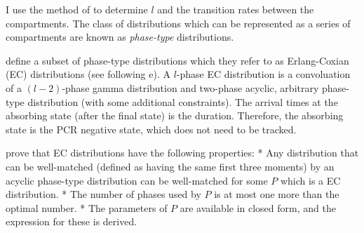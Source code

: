 \documentclass[thesis.tex]{subfiles}
\begin{document}
I use the method of \textcite{osogamiClosed} to determine $l$ and the transition rates between the compartments.
The class of distributions which can be represented as a series of compartments are known as \emph{phase-type} distributions.

\Textcite{osogamiClosed} define a subset of phase-type distributions which they refer to as Erlang-Coxian (EC) distributions (see following e).
A $l$-phase EC distribution is a convoluation of a $(l-2)$-phase gamma distribution and two-phase acyclic, arbitrary phase-type distribution (with some additional constraints).
The arrival times at the absorbing state (after the final state) is the duration.
Therefore, the absorbing state is the PCR negative state, which does not need to be tracked.

\Textcite{osogamiClosed} prove that EC distributions have the following properties:
* Any distribution that can be well-matched (defined as having the same first three moments) by an acyclic
phase-type distribution can be well-matched for some $P$
which is a EC distribution.
* The number of phases used by $P$ is at most one more than the optimal number.
* The parameters of $P$ are available in closed form, and the expression for these is derived.
\end{document}
